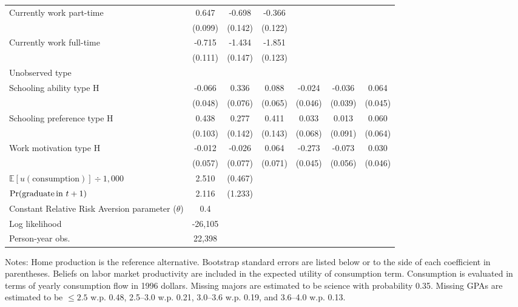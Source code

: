 \begin{table}[ht]
{\begin{threeparttable}
\begin{tabular}{lcccccc}
Currently work part-time &   0.647 &  -0.698 &  -0.366 &   &   &   \\ 
 & (0.099) & (0.142) & (0.122) &  &  &  \\ 
Currently work full-time &  -0.715 &  -1.434 &  -1.851 &   &   &   \\ 
 & (0.111) & (0.147) & (0.123) &  &  &  \\ 
\midrule
Unobserved type \\ 
Schooling ability type H &  -0.066 &   0.336 &   0.088 &  -0.024 &  -0.036 &   0.064 \\ 
 & (0.048) & (0.076) & (0.065) & (0.046) & (0.039) & (0.045) \\ 
Schooling preference type H &   0.438 &   0.277 &   0.411 &   0.033 &   0.013 &   0.060 \\ 
 & (0.103) & (0.142) & (0.143) & (0.068) & (0.091) & (0.064) \\ 
Work motivation type H &  -0.012 &  -0.026 &   0.064 &  -0.273 &  -0.073 &   0.030 \\ 
 & (0.057) & (0.077) & (0.071) & (0.045) & (0.056) & (0.046) \\ 
\midrule
$\mathbb{E}[u(\text{consumption})] \div 1,000$ & 2.510 & (0.467) & & & & \\ 
$\Pr(\text{graduate\,in\,\,} t+1)$               & 2.116 & (1.233) & & & & \\ 
Constant Relative Risk Aversion parameter ($\theta$) &  0.4 & & & & & \\ 
Log likelihood & -26,105 & & & & & \\ 
Person-year obs. & 22,398 & & & & & \\ 
\bottomrule
\end{tabular}
\footnotesize Notes: Home production is the reference alternative. Bootstrap standard errors are listed below or to the side of each coefficient in parentheses. Beliefs on labor market productivity are included in the expected utility of consumption term. Consumption is evaluated in terms of yearly consumption flow in 1996 dollars.  Missing majors are estimated to be science with probability 0.35. Missing GPAs are estimated to be $\leq2.5$ w.p. 0.48, 2.5--3.0 w.p. 0.21, 3.0--3.6 w.p. 0.19, and 3.6--4.0 w.p. 0.13. 


\end{threeparttable}}
\end{table}
